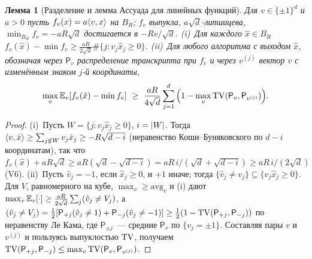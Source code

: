 \documentclass[11pt,a4paper]{article}
\numberwithin{equation}{section}
\newtheorem{lemma}[theorem]{Лемма}
\theoremstyle{definition}
\theoremstyle{remark}
\newcommand{\E}{\mathbb E}\newcommand{\R}{\mathbb R}\newcommand{\Z}{\mathbb Z}\let\Prob\relax\newcommand{\Prob}{\mathbb P}
\begin{document}
\begin{lemma}[Разделение и лемма Ассуада для линейных функций]\label{lem:assouad}
Для $v\in\{\pm1\}^d$ и $a>0$ пусть $f_v(x)=a\langle v,x\rangle$ на $B_R$; $f_v$ выпукла, $a\sqrt d$-липшицева, $\min_{B_R}f_v=-aR\sqrt d$ достигается в $-Rv/\sqrt d$. (i)~Для каждого $\hat x\in B_R$ $f_v(\hat x)-\min f_v\ge\frac{aR}{2\sqrt d}\#\{j:v_j\hat x_j\ge0\}$. (ii)~Для любого алгоритма с выходом $\hat x$, обозначая через $\mathsf P_v$ распределение транскрипта при $f_v$ и через $v^{(j)}$ вектор $v$ с изменённым знаком $j$-й координаты,
\[
\max_v\E_v[f_v(\hat x)-\min f_v]\ \ge\ \frac{aR}{4\sqrt d}\sum_{j=1}^d\Big(1-\max_{v}\TV(\mathsf P_v,\mathsf P_{v^{(j)}})\Big).
\]
\end{lemma}
\begin{proof}
(i)~Пусть $W=\{j:v_j\hat x_j\ge0\}$, $i=\lvert W\rvert$. Тогда $\langle v,\hat x\rangle\ge\sum_{j\notin W}v_j\hat x_j\ge-R\sqrt{d-i}$ (неравенство Коши--Буняковского по $d-i$ координатам), так что $f_v(\hat x)+aR\sqrt d\ge aR(\sqrt d-\sqrt{d-i})=aR\,i/(\sqrt d+\sqrt{d-i})\ge aR\,i/(2\sqrt d)$ (V6). (ii)~Пусть $\hat v_j=-1$, если $\hat x_j\ge0$, и $+1$ иначе; тогда $\{\hat v_j\ne v_j\}\subseteq\{v_j\hat x_j\ge0\}$. Для $V$, равномерного на кубе, $\max_v\ge\mathrm{avg}_v$ и (i) дают $\max_v\E_v[\cdot]\ge\frac{aR}{2\sqrt d}\sum_j\Prob(\hat v_j\ne V_j)$, а $\Prob(\hat v_j\ne V_j)=\frac12[\mathsf P_{+j}(\hat v_j\ne1)+\mathsf P_{-j}(\hat v_j\ne-1)]\ge\frac12(1-\TV(\mathsf P_{+j},\mathsf P_{-j}))$ по неравенству Ле Кама, где $\mathsf P_{\pm j}$~--- средние $\mathsf P_v$ по $\{v_j=\pm1\}$. Составляя пары $v$ и $v^{(j)}$ и пользуясь выпуклостью $\mathrm{TV}$, получаем $\mathrm{TV}(\mathsf P_{+j},\mathsf P_{-j})\le\max_v\mathrm{TV}(\mathsf P_v,\mathsf P_{v^{(j)}})$.
\end{proof}
\end{document}
